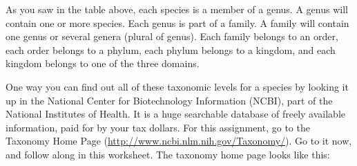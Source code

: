 \documentclass[11pt]{exam}
\begin{document}
%
%

%
As you saw in the table above, each species is a member of a genus. 
A genus will contain one or more species. Each genus is part of a family. 
A family will contain one genus or several genera (plural of genus). 
Each family belongs to an order, each order belongs to a phylum, each phylum 
belongs to a kingdom, and each kingdom belongs to one of the three domains.


One way you can find out all of these taxonomic levels for a species by looking
it up in the National Center for Biotechnology Information (NCBI), part
of the National Institutes of Health. It is a huge searchable database
of freely available information, paid for by your tax dollars. For this
assignment, go to the Taxonomy Home Page
(\url{http://www.ncbi.nlm.nih.gov/Taxonomy/}). Go to it now, and follow along
in this worksheet. The taxonomy home page looks like this:
\end{document}
